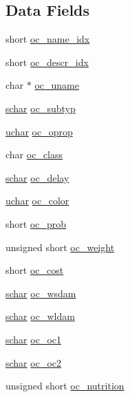 \subsection*{Data Fields}
\begin{DoxyCompactItemize}
\item 
short \hyperlink{structobjclass_adb4e710c1fe8070f63bb31017783e1ff}{oc\+\_\+name\+\_\+idx}
\item 
short \hyperlink{structobjclass_a4b22aa20d7c87b250d6696e1614b86cc}{oc\+\_\+descr\+\_\+idx}
\item 
char $\ast$ \hyperlink{structobjclass_a2556428315c0776ce8f5c88ecf6508bc}{oc\+\_\+uname}
\item 
\hyperlink{config_8h_a0fd9ce9d735064461bebfe6037026093}{schar} \hyperlink{structobjclass_aceb03436eb0a4aa94613ece9fed7b141}{oc\+\_\+subtyp}
\item 
\hyperlink{config_8h_a65f85814a8290f9797005d3b28e7e5fc}{uchar} \hyperlink{structobjclass_a3a6ca47a71d5a816b8661d90442baf46}{oc\+\_\+oprop}
\item 
char \hyperlink{structobjclass_ae589e91e556e204c84f05597da510559}{oc\+\_\+class}
\item 
\hyperlink{config_8h_a0fd9ce9d735064461bebfe6037026093}{schar} \hyperlink{structobjclass_a3469efe1c95970cd0360b882459a42ae}{oc\+\_\+delay}
\item 
\hyperlink{config_8h_a65f85814a8290f9797005d3b28e7e5fc}{uchar} \hyperlink{structobjclass_a85f741db040715f310a309de52bc1574}{oc\+\_\+color}
\item 
short \hyperlink{structobjclass_a925611795481028809437d812eef055d}{oc\+\_\+prob}
\item 
unsigned short \hyperlink{structobjclass_a622ad2b24eb1e4b8386a4c8d04a8a5bc}{oc\+\_\+weight}
\item 
short \hyperlink{structobjclass_aaf9cdc5c158d5ee7aad87728dcaa31cf}{oc\+\_\+cost}
\item 
\hyperlink{config_8h_a0fd9ce9d735064461bebfe6037026093}{schar} \hyperlink{structobjclass_aafe7abae4189e2b8a8b5c697ae679415}{oc\+\_\+wsdam}
\item 
\hyperlink{config_8h_a0fd9ce9d735064461bebfe6037026093}{schar} \hyperlink{structobjclass_a5b1b27312dd044cae590ed1cabc33c7b}{oc\+\_\+wldam}
\item 
\hyperlink{config_8h_a0fd9ce9d735064461bebfe6037026093}{schar} \hyperlink{structobjclass_a178ccb90cab344e173f04fa0def67525}{oc\+\_\+oc1}
\item 
\hyperlink{config_8h_a0fd9ce9d735064461bebfe6037026093}{schar} \hyperlink{structobjclass_a3eae455af5b64e4300899f46c39eee3a}{oc\+\_\+oc2}
\item 
unsigned short \hyperlink{structobjclass_a1c4aaf256145aed97ad16cc00d1ee7dd}{oc\+\_\+nutrition}
\end{DoxyCompactItemize}


